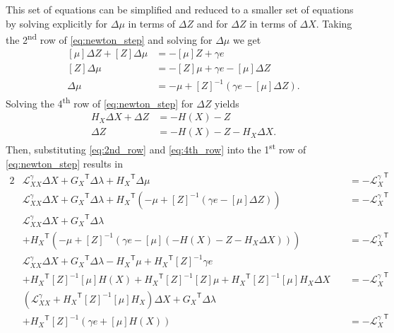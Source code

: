 \documentclass[12pt]{article}
\newcommand{\trans}[1]{{#1}^{\ensuremath{\mathsf{T}}}}  %
\newcommand{\diag}[1]{\left[{#1}\right]}                %
\numberwithin{equation}{section}
\numberwithin{table}{section}
\numberwithin{figure}{section}
\begin{document}
\begin{appendices}
This set of equations can be simplified and reduced to a smaller set of equations by solving explicitly for $\Delta \mu$ in terms of $\Delta Z$ and for $\Delta Z$ in terms of $\Delta X$. Taking the 2\textsuperscript{nd} row of \eqref{eq:newton_step} and solving for $\Delta \mu$ we get
\begin{align}
\diag{\mu} \Delta Z + \diag{Z} \Delta \mu &= -\diag{\mu} Z + \gamma e \nonumber \\
\diag{Z} \Delta \mu &= -\diag{Z} \mu + \gamma e - \diag{\mu} \Delta Z \nonumber \\
\Delta \mu &= - \mu + \diag{Z}^{-1} (\gamma e - \diag{\mu} \Delta Z).
\label{eq:2nd_row}
\end{align}
Solving the 4\textsuperscript{th} row of \eqref{eq:newton_step} for $\Delta Z$ yields
\begin{align}
H_X \Delta X + \Delta Z &= -H(X) - Z \nonumber \\
\Delta Z &= -H(X) - Z - H_X \Delta X.
\label{eq:4th_row}
\end{align}
Then, substituting \eqref{eq:2nd_row} and \eqref{eq:4th_row} into the 1\textsuperscript{st} row of \eqref{eq:newton_step} results in
\begin{alignat}{2}
&\mathcal{L}^\gamma_{XX} \Delta X + \trans{G_X} \Delta \lambda + \trans{H_X} \Delta \mu &&\;= -\trans{\mathcal{L}^\gamma_X} \nonumber \\
&\mathcal{L}^\gamma_{XX} \Delta X + \trans{G_X} \Delta \lambda + \trans{H_X} (- \mu + \diag{Z}^{-1} (\gamma e - \diag{\mu} \Delta Z)) &&\;= -\trans{\mathcal{L}^\gamma_X} \nonumber \\
&\mathcal{L}^\gamma_{XX} \Delta X + \trans{G_X} \Delta \lambda & \nonumber \\
&+ \trans{H_X} (- \mu + \diag{Z}^{-1} (\gamma e - \diag{\mu} (-H(X) - Z - H_X \Delta X))) &&\;= -\trans{\mathcal{L}^\gamma_X} \nonumber \\
&\mathcal{L}^\gamma_{XX} \Delta X + \trans{G_X} \Delta \lambda - \trans{H_X} \mu + \trans{H_X} \diag{Z}^{-1} \gamma e & \nonumber \\
&+ \trans{H_X} \diag{Z}^{-1} \diag{\mu} H(X) + \trans{H_X} \diag{Z}^{-1} \diag{Z} \mu + \trans{H_X} \diag{Z}^{-1} \diag{\mu} H_X \Delta X &&\;= -\trans{\mathcal{L}^\gamma_X} \nonumber \\
&(\mathcal{L}^\gamma_{XX} + \trans{H_X} \diag{Z}^{-1} \diag{\mu} H_X) \Delta X + \trans{G_X} \Delta \lambda  & \nonumber \\
&+ \trans{H_X} \diag{Z}^{-1} (\gamma e + \diag{\mu} H(X)) &&\;= -\trans{\mathcal{L}^\gamma_X} \nonumber \\

\end{alignat}
\end{appendices}
\end{document}
